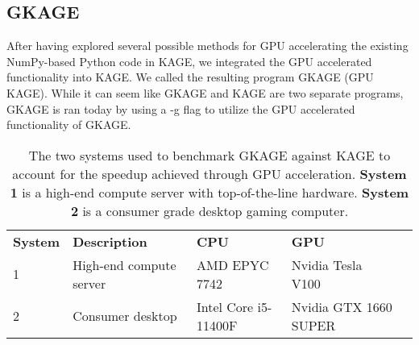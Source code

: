 \subsection{GKAGE} \label{results:gkage}
After having explored several possible methods for GPU accelerating the existing NumPy-based Python code in KAGE, we integrated the GPU accelerated functionality into KAGE.
We called the resulting program GKAGE (GPU KAGE).
While it can seem like GKAGE and KAGE are two separate programs, GKAGE is ran today by using a -g flag to utilize the GPU accelerated functionality of GKAGE.

\begin{table}[H]
\begin{tabular}{lllll}
\cline{1-4}
\multicolumn{1}{|l|}{\textbf{System}} & \multicolumn{1}{l|}{\textbf{Description}}               & \multicolumn{1}{l|}{\textbf{CPU}}                  & \multicolumn{1}{l|}{\textbf{GPU}}                   &  \\ \cline{1-4}
\multicolumn{1}{|l|}{1}      & \multicolumn{1}{l|}{High-end compute server}   & \multicolumn{1}{l|}{AMD EPYC 7742}        & \multicolumn{1}{l|}{Nvidia Tesla V100}     &  \\ \cline{1-4}
\multicolumn{1}{|l|}{2}      & \multicolumn{1}{l|}{Consumer desktop} & \multicolumn{1}{l|}{Intel Core i5-11400F} & \multicolumn{1}{l|}{Nvidia GTX 1660 SUPER} &  \\ \cline{1-4}
\end{tabular}
\caption{
  The two systems used to benchmark GKAGE against KAGE to account for the speedup achieved through GPU acceleration.
  \textbf{System 1} is a high-end compute server with top-of-the-line hardware.
  \textbf{System 2} is a consumer grade desktop gaming computer.
}
\label{results:gkage:tables:systems}
\end{table}
